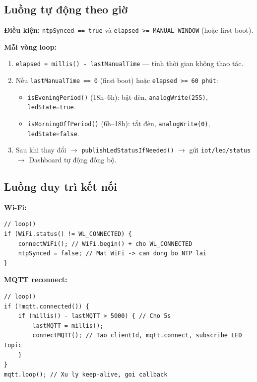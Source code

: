 \documentclass[13pt,a4paper]{article}
\newcommand{\code}[1]{\texttt{#1}}
\begin{document}
\subsection{Luồng tự động theo giờ}
\label{sec:luong4}

\textbf{Điều kiện:} \code{ntpSynced == true} và \code{elapsed >= MANUAL\_WINDOW} (hoặc first boot).

\textbf{Mỗi vòng loop:}

\begin{enumerate}[label=\arabic*., leftmargin=1.5cm]
    \item \code{elapsed = millis() - lastManualTime} --- tính thời gian không thao tác.
    \item Nếu \code{lastManualTime == 0} (first boot) hoặc \code{elapsed >= 60 phút}:
    \begin{itemize}
        \item \code{isEveningPeriod()} (18h--6h): bật đèn, \code{analogWrite(255)}, \code{ledState=true}.
        \item \code{isMorningOffPeriod()} (6h--18h): tắt đèn, \code{analogWrite(0)}, \code{ledState=false}.
    \end{itemize}
    \item Sau khi thay đổi $\rightarrow$ \code{publishLedStatusIfNeeded()} $\rightarrow$ gửi \code{iot/led/status} $\rightarrow$ Dashboard tự động đồng bộ.
\end{enumerate}

\subsection{Luồng duy trì kết nối}
\label{sec:luong5}

\textbf{Wi-Fi:}

\begin{lstlisting}[style=cppcode, caption={Kiểm tra và kết nối lại Wi-Fi}, label={lst:wifi}]
// loop()
if (WiFi.status() != WL_CONNECTED) {
    connectWiFi(); // WiFi.begin() + cho WL_CONNECTED
    ntpSynced = false; // Mat WiFi -> can dong bo NTP lai
}
\end{lstlisting}

\textbf{MQTT reconnect:}

\begin{lstlisting}[style=cppcode, caption={Kiểm tra và kết nối lại MQTT}, label={lst:mqtt}]
// loop()
if (!mqtt.connected()) {
    if (millis() - lastMQTT > 5000) { // Cho 5s
        lastMQTT = millis();
        connectMQTT(); // Tao clientId, mqtt.connect, subscribe LED topic
    }
}
mqtt.loop(); // Xu ly keep-alive, goi callback
\end{lstlisting}
\end{document}
